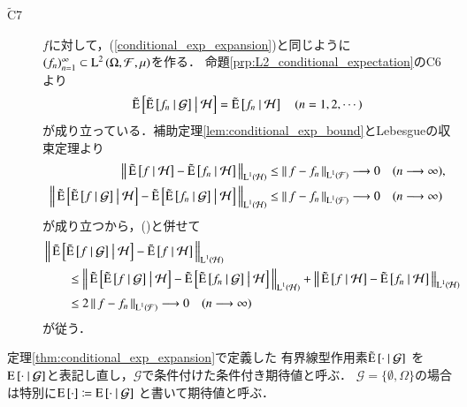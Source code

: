 \begin{prf}
\begin{description}
			\item[$\tilde{\mathrm{C}}$7]
				$f$に対して，(\ref{conditional_exp_expansion})と同じように$(f_n)_{n=1}^{\infty} \subset \Lp{2}{\Omega,\mathcal{F},\mu}$を作る．
				命題\ref{prp:L2_conditional_expectation}のC6より
				\begin{align}
					\tcexp{\tcexp{f_n}{\mathcal{G}}}{\mathcal{H}} = \tcexp{f_n}{\mathcal{H}}
					\quad (n=1,2,\cdots)
					\label{eq:conditional_exp_L1_2}
				\end{align}
				が成り立っている．補助定理\ref{lem:conditional_exp_bound}とLebesgueの収束定理より
				\begin{align}
					\Norm{ \tcexp{f}{\mathcal{H}} -  \tcexp{f_n}{\mathcal{H}}}{\Lp{1}{\mathcal{H}}}
					&\leq \Norm{f -  f_n}{\Lp{1}{\mathcal{F}}}
					\longrightarrow 0 \quad (n \longrightarrow \infty), \\
					\Norm{ \tcexp{\tcexp{f}{\mathcal{G}}}{\mathcal{H}} -  \tcexp{\tcexp{f_n}{\mathcal{G}}}{\mathcal{H}}}{\Lp{1}{\mathcal{H}}}
					&\leq \Norm{f -  f_n}{\Lp{1}{\mathcal{F}}}
					\longrightarrow 0 \quad (n \longrightarrow \infty)
				\end{align}
				が成り立つから，()と併せて
				\begin{align}
					&\Norm{ \tcexp{\tcexp{f}{\mathcal{G}}}{\mathcal{H}} - \tcexp{f}{\mathcal{H}} }{\Lp{1}{\mathcal{H}}} \\
					&\qquad\leq \Norm{ \tcexp{\tcexp{f}{\mathcal{G}}}{\mathcal{H}} -  \tcexp{\tcexp{f_n}{\mathcal{G}}}{\mathcal{H}}}{\Lp{1}{\mathcal{H}}}
						+ \Norm{ \tcexp{f}{\mathcal{H}} -  \tcexp{f_n}{\mathcal{H}}}{\Lp{1}{\mathcal{H}}} \\
					&\qquad \leq 2 \Norm{f -  f_n}{\Lp{1}{\mathcal{F}}} \longrightarrow 0 \quad (n \longrightarrow \infty)
				\end{align}
				が従う．
				\QED
		\end{description}
	\end{prf}
	
	\begin{screen}
		\begin{dfn}[条件付き期待値の再定義]
			定理\ref{thm:conditional_exp_expansion}で定義した
			有界線型作用素$\tcexp{\cdot}{\mathcal{G}}$
			を$\cexp{\cdot}{\mathcal{G}}$と表記し直し，$\mathcal{G}$で条件付けた条件付き期待値と呼ぶ．
			$\mathcal{G} = \{\emptyset, \Omega\}$の場合は特別に$\Exp{\cdot} \coloneqq \cexp{\cdot}{\mathcal{G}}$
			と書いて期待値と呼ぶ．
		\end{dfn}
	\end{screen}